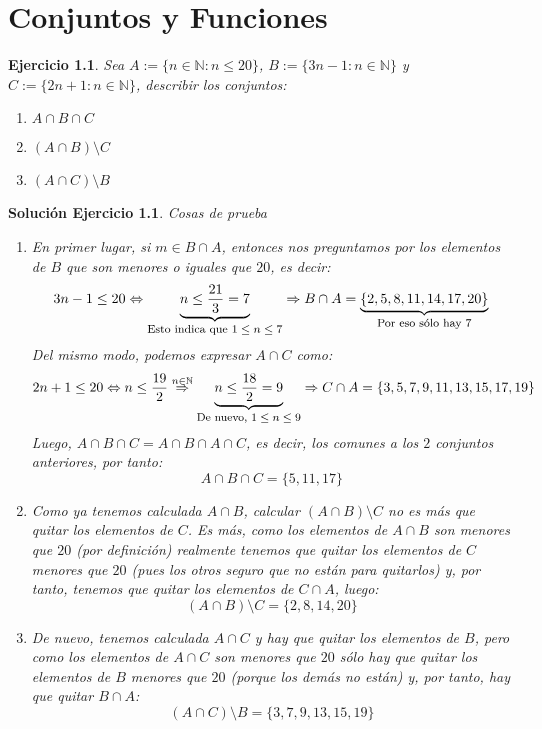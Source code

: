 \documentclass[10pt,a4paper,openright]{book}
\newtheorem{ej}{Ejercicio}
\newtheorem{sol}{Solución Ejercicio}
\begin{document}
\mainmatter
\hypersetup{linkcolor=black} %
\setcounter{tocdepth}{3}%
\setcounter{secnumdepth}{4}%
\tableofcontents
\hypersetup{linkcolor=blue} %

\chapter{Conjuntos y Funciones}
\begin{ej}
Sea $A:=\{n\in \mathbb{N} : n \leq 20\}$, $B:=\{3n-1 : n\in \mathbb{N}\}$ y $C:=\{2n+1 : n\in \mathbb{N}\}$, describir los conjuntos:
\begin{enumerate}
\item $A\cap B\cap C$
\item $(A\cap B)\setminus C$
\item $(A\cap C)\setminus B$
\end{enumerate}
\end{ej}
\begin{sol}
Cosas de prueba
\begin{enumerate}
\item En primer lugar, si $m\in B \cap A$, entonces nos preguntamos por los elementos de $B$ que son menores o iguales que $20$, es decir:
$$3n-1 \leq 20 \Leftrightarrow \underbrace{n \leq \frac{21}{3} = 7}_{\mbox{\footnotesize{Esto indica que $1\leq n \leq 7$}}} \Rightarrow B\cap A = \underbrace{\{2,5,8,11,14,17,20\}}_{\mbox{\footnotesize{Por eso sólo hay 7}}}$$
Del mismo modo, podemos expresar $A\cap C$ como:
$$2n+1 \leq 20 \Leftrightarrow n \leq \frac{19}{2} \stackrel{n\in \mathbb{N}}{\Rightarrow} \underbrace{n\leq \frac{18}{2} = 9}_{\mbox{\footnotesize{De nuevo, $1\leq n\leq 9$}}} \Rightarrow C\cap A = \{3,5,7,9,11,13,15,17,19\}$$
Luego, $A\cap B\cap C = A\cap B \cap A \cap C$, es decir, los comunes a los $2$ conjuntos anteriores, por tanto:
$$A\cap B \cap C = \{5,11,17\}$$

\item Como ya tenemos calculada $A\cap B$, calcular $(A\cap B)\setminus C$ no es más que quitar los elementos de $C$. Es más, como los elementos de $A\cap B$ son menores que $20$ (por definición) realmente tenemos que quitar los elementos de $C$ menores que $20$ (pues los otros seguro que no están para quitarlos) y, por tanto, tenemos que quitar los elementos de $C\cap A$, luego:
$$(A\cap B)\setminus C = \{2,8,14,20\}$$

\item De nuevo, tenemos calculada $A\cap C$ y hay que quitar los elementos de $B$, pero como los elementos de $A \cap C$ son menores que $20$ sólo hay que quitar los elementos de $B$ menores que $20$ (porque los demás no están) y, por tanto, hay que quitar $B\cap A$:
$$(A\cap C)\setminus B = \{3,7,9,13,15,19\}$$
\end{enumerate}
\end{sol}
\end{document}
